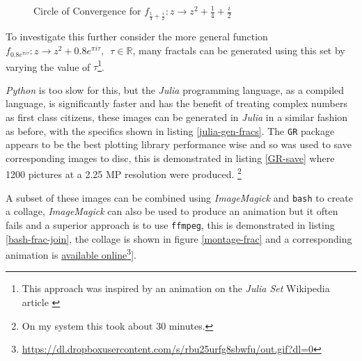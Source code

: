 \documentclass[a4paper,11pt,twoside]{article}
\begin{document}
\begin{figure}[htbp]
\centering

\caption{\label{py-jl-rab-plot}Circle of Convergence for \(f_{\frac{1}{4} + \frac{i}{2}}: z \rightarrow z^{2} + \frac{1}{4} + \frac{i}{2}\)}
\end{figure}

To investigate this further consider the
more general function \(f_{0.8 e^{\pi i \tau}}: z \rightarrow z^{2} + 0.8 e^{\pi
i \tau}, \enspace \tau \in \mathbb{R}\), many fractals can be generated using
this set by varying the value of \(\tau\)\footnote{This approach was inspired by an animation on the \emph{Julia Set} Wikipedia article \cite{JuliaSet2020}}.

\emph{Python} is too slow for this, but the \emph{Julia} programming language, as a
compiled language, is significantly faster and has the benefit of treating
complex numbers as first class citizens, these images can be generated in
\emph{Julia} in a similar fashion as before, with the specifics shown in listing
\ref{julia-gen-fracs}. The \texttt{GR} package appears to be the best plotting library
performance wise and so was used to save corresponding images to disc, this is
demonstrated in listing \ref{GR-save} where 1200 pictures at a 2.25 MP resolution were produced. \footnote{On my system this took about 30 minutes.}

A subset of these images can be combined using \emph{ImageMagick} and \texttt{bash} to
create a collage, \emph{ImageMagick} can also be used to produce an animation but it often
fails and a superior approach is to use \texttt{ffmpeg}, this is demonstrated in
listing \ref{bash-frac-join}, the collage is shown in figure \ref{montage-frac} and a corresponding
animation is \href{https://dl.dropboxusercontent.com/s/rbu25urfg8sbwfu/out.gif?dl=0}{available online}\footnote{\href{https://dl.dropboxusercontent.com/s/rbu25urfg8sbwfu/out.gif?dl=0}{https://dl.dropboxusercontent.com/s/rbu25urfg8sbwfu/out.gif?dl=0}}].
\end{document}
